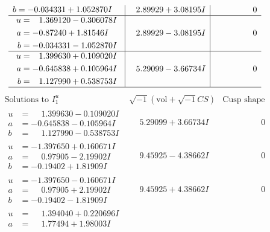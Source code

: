 \documentclass[1p]{elsarticle_modified}
\theoremstyle{definition}
\newcommand{\I}{\sqrt{-1}}
\begin{document}
$$\begin{array}{c|c|c}
\begin{aligned}
b &= -0.034331 + 1.052870 I\end{aligned}
 & \phantom{-}2.89929 + 3.08195 I & \phantom{-0.000000 } 0 \\ \hline\begin{aligned}
u &= \phantom{-}1.369120 - 0.306078 I \\
a &= -0.87240 + 1.81546 I \\
b &= -0.034331 - 1.052870 I\end{aligned}
 & \phantom{-}2.89929 - 3.08195 I & \phantom{-0.000000 } 0 \\ \hline\begin{aligned}
u &= \phantom{-}1.399630 + 0.109020 I \\
a &= -0.645838 + 0.105964 I \\
b &= \phantom{-}1.127990 + 0.538753 I\end{aligned}
 & \phantom{-}5.29099 - 3.66734 I & \phantom{-0.000000 } 0\\
 \hline 
 \end{array}$$\newpage$$\begin{array}{c|c|c}  
\text{Solutions to }I^u_{1}& \I (\text{vol} + \sqrt{-1}CS) & \text{Cusp shape}\\
 \hline 
\begin{aligned}
u &= \phantom{-}1.399630 - 0.109020 I \\
a &= -0.645838 - 0.105964 I \\
b &= \phantom{-}1.127990 - 0.538753 I\end{aligned}
 & \phantom{-}5.29099 + 3.66734 I & \phantom{-0.000000 } 0 \\ \hline\begin{aligned}
u &= -1.397650 + 0.160671 I \\
a &= \phantom{-}0.97905 - 2.19902 I \\
b &= -0.19402 + 1.81909 I\end{aligned}
 & \phantom{-}9.45925 - 4.38662 I & \phantom{-0.000000 } 0 \\ \hline\begin{aligned}
u &= -1.397650 - 0.160671 I \\
a &= \phantom{-}0.97905 + 2.19902 I \\
b &= -0.19402 - 1.81909 I\end{aligned}
 & \phantom{-}9.45925 + 4.38662 I & \phantom{-0.000000 } 0 \\ \hline\begin{aligned}
u &= \phantom{-}1.394040 + 0.220696 I \\
a &= \phantom{-}1.77494 + 1.98003 I \\

\end{aligned}
\end{array}$$
\end{document}
